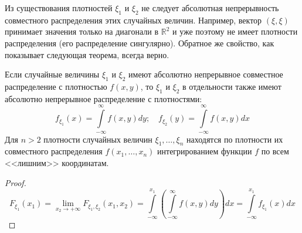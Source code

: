 \begin{rmrk}
    Из существования плотностей $\xi_1$ и $\xi_2$ не следует абсолютная непрерывность совместного распределения этих случайных величин. 
    Например, вектор $(\xi, \xi)$ принимает значения только на диагонали в $\mathbb{R}^2$ и уже поэтому не имеет плотности распределения (его распределение сингулярно). 
    Обратное же свойство, как показывает следующая теорема, всегда верно.
\end{rmrk}

\begin{thm*}
    Если случайные величины $\xi_1$ и $\xi_2$ имеют абсолютно непрерывное совместное распределение с плотностью $f(x, y)$, то $\xi_1$ и $\xi_2$ в отдельности также имеют абсолютно непрерывное распределение с плотностями:
    \begin{equation*}
        f_{\xi_{1}}(x)=\int\limits_{-\infty}^{\infty} f(x, y) d y ; \quad f_{\xi_{2}}(y)=\int\limits_{-\infty}^{\infty} f(x, y) d x
    \end{equation*}
    Для $n > 2$ плотности случайных величин $\xi_1, \ldots, \xi_n$ находятся по плотности их совместного распределения $f(x_1, \ldots, x_n)$ интегрированием функции $f$ по всем <<лишним>> координатам.
\end{thm*}
\begin{proof}
\begin{equation*}
    F_{\xi_{1}}\left(x_{1}\right)
    = \lim _{x_{2} \rightarrow+\infty} F_{\xi_{1}, \xi_{2}}\left(x_{1}, x_{2}\right)
    = \int\limits_{-\infty}^{x_{1}}\left(\int\limits_{-\infty}^{\infty} f(x, y) d y\right) d x
    = \int\limits_{-\infty}^{x_{1}} f_{\xi_{1}}(x) d x
\end{equation*}
\end{proof}


